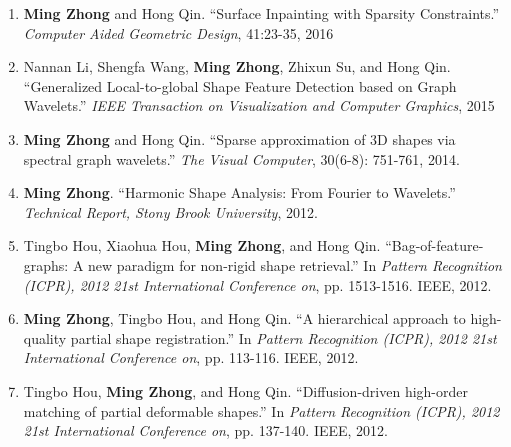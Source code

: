 \documentclass[12pt,letterpaper,twosided]{report}
\numberwithin{equation}{section}
\begin{document}
\begin{enumerate}
\item \textbf{Ming Zhong} and Hong Qin. ``Surface Inpainting with Sparsity Constraints.'' \emph{Computer Aided Geometric Design}, 41:23-35, 2016
\item Nannan Li, Shengfa Wang, \textbf{Ming Zhong}, Zhixun Su, and Hong Qin. ``Generalized Local-to-global Shape Feature Detection based on Graph Wavelets.'' \emph{IEEE Transaction on Visualization and Computer Graphics}, 2015
\item \textbf{Ming Zhong} and Hong Qin. ``Sparse approximation of 3D shapes via spectral graph wavelets.'' \emph{The Visual Computer}, 30(6-8): 751-761, 2014.
\item \textbf{Ming Zhong}. ``Harmonic Shape Analysis: From Fourier to Wavelets.'' \emph{Technical Report, Stony Brook University}, 2012.
\item Tingbo Hou, Xiaohua Hou, \textbf{Ming Zhong}, and Hong Qin. ``Bag-of-feature-graphs: A new paradigm for non-rigid shape retrieval.'' In \emph{Pattern Recognition (ICPR), 2012 21st International Conference on}, pp. 1513-1516. IEEE, 2012.
\item \textbf{Ming Zhong}, Tingbo Hou, and Hong Qin. ``A hierarchical approach to high-quality partial shape registration.'' In \emph{Pattern Recognition (ICPR), 2012 21st International Conference on}, pp. 113-116. IEEE, 2012.
\item Tingbo Hou, \textbf{Ming Zhong}, and Hong Qin. ``Diffusion-driven high-order matching of partial deformable shapes.'' In \emph{Pattern Recognition (ICPR), 2012 21st International Conference on}, pp. 137-140. IEEE, 2012.
\end{enumerate}

\newpage
\pagestyle{fancy}
\fancyhead{}
\fancyhead[RO,LE]{\thepage}
\fancyhead[LO]{\leftmark}
\fancyhead[RE]{\rightmark}
\fancyfoot{}
\renewcommand{\headrulewidth}{0.5pt}

\graphicspath{{fig-intro/}}

\graphicspath{{figures/}}

\graphicspath{{fig-approximation/}}

\graphicspath{{fig-inpainting/}}

\graphicspath{{fig-feature/}}

\graphicspath{{figures/}}




{}


\end{document}
